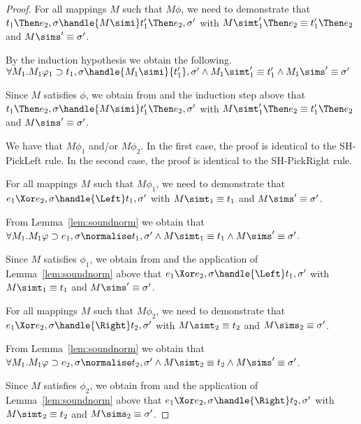 \begin{proof}
  {For all mappings $M$ such that $M\phi$, we need to demonstrate that\\
  $t_1\Then e_2,\sigma\handle{M\simi}t_1'\Then e_2,\sigma'$ with
  $M \simt_1'\Then e_2\equiv {t_1'}\Then e_2$ and $M\sims'\equiv{\sigma'}$.

  By the induction hypothesis we obtain the following.\\
  $\forall M_1 . M_1 \phi_1 \implies t_1,\sigma \handle{M_1 \simi} {t_1'},{\sigma'}\land M_1 \simt_1'\equiv{t_1'}\land M_1\sims' \equiv {\sigma'}$

  Since $M$ satisfies $\phi$, we obtain from  and the induction step above that $t_1\Then e_2,\sigma\handle{M\simi}t_1'\Then e_2,\sigma'$ with
  $M \simt_1'\Then e_2\equiv {t_1'}\Then e_2$ and $M\sims'\equiv{\sigma'}$.
  }

    {
    We have that $M\phi_1$ and/or $M\phi_2$.
    In the first case, the proof is identical to the SH-PickLeft rule.
    In the second case, the proof is identical to the SH-PickRight rule.
    }

    {For all mappings $M$ such that  $M\phi_1$, we need to demonstrate that\\
    $e_1\Xor e_2,\sigma\handle{\Left}t_1,\sigma'$ with
    $M \simt_1\equiv {t_1}$ and $M\sims'\equiv {\sigma'}$.

    From Lemma~\ref{lem:soundnorm} we obtain that $\forall M_1. M_1 \phi \implies e_1,\sigma{\normalise}{t_1},{\sigma'}\land M \simt_1\equiv{t_1}\land M \sims'\equiv{\sigma'}$.

    Since $M$ satisfies $\phi_1$, we obtain from  and the application of Lemma~\ref{lem:soundnorm} above that $e_1\Xor e_2,\sigma\handle{\Left}t_1,\sigma'$ with
    $M \simt_1\equiv {t_1}$ and $M\sims'\equiv {\sigma'}$.
    }

    {For all mappings $M$ such that $M\phi_2$, we need to demonstrate that\\
    $e_1\Xor e_2,\sigma\handle{\Right}t_2,\sigma'$ with
    $M \simt_2\equiv {t_2}$ and $M\sims_2\equiv {\sigma'}$.

    From Lemma~\ref{lem:soundnorm} we obtain that $\forall M_1. M_1 \phi \implies e_2,\sigma{\normalise}{t_2},{\sigma'}\land M \simt_2\equiv{t_2}\land M \sims'\equiv{\sigma'}$.

    Since $M$ satisfies $\phi_2$, we obtain from  and the application of Lemma~\ref{lem:soundnorm} above that $e_1\Xor e_2,\sigma\handle{\Right}t_2,\sigma'$ with
    $M \simt_2\equiv {t_2}$ and $M\sims_2\equiv {\sigma'}$.
    }


\end{proof}
